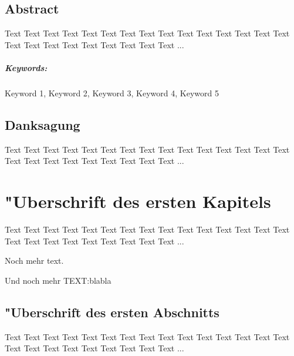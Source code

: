 \documentclass[a4paper,bibtotoc,oneside]{scrbook}
\begin{document}
\newpage

\section*{Abstract}\thispagestyle{empty}
Text Text Text Text Text Text Text Text Text Text Text Text Text Text Text Text Text Text Text Text Text Text Text Text ...
\\ \vfill
\paragraph*{Keywords:} Keyword 1, Keyword 2, Keyword 3, Keyword 4, Keyword 5
\newpage

\section*{Danksagung}\thispagestyle{empty}
Text Text Text Text Text Text Text Text Text Text Text Text Text Text Text Text Text Text Text Text Text Text Text Text ...
\newpage

\tableofcontents\thispagestyle{empty}
\newpage

\setcounter{page}{1}

\chapter[Erstes Kapitel]{"Uberschrift des ersten Kapitels}

Text Text Text Text Text Text Text Text Text Text Text Text Text Text Text Text Text Text Text Text Text Text Text Text ...

Noch mehr text.

Und noch mehr TEXT:blabla

\section[Erster Abschnitt]{"Uberschrift des ersten Abschnitts}

Text Text Text Text Text Text Text Text Text Text Text Text Text Text Text Text Text Text Text Text Text Text Text Text ...
\end{document}
